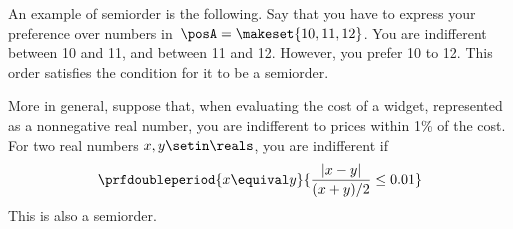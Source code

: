 \begin{example}
    An example of semiorder is the following.
    Say that you have to express your preference over numbers in~$\posA=\makeset{10,11,12}$.
    You are indifferent between 10 and 11, and between 11 and 12.
    However, you prefer 10 to 12.
    This order satisfies the condition for it to be a semiorder.

    More in general, suppose that, when evaluating the cost of a widget, represented as a nonnegative real number, you are indifferent to prices within 1\% of the cost.
    For two real numbers $x,y\setin\reals$, you are indifferent if
    \begin{equation}\label{eq:semiorder-tolerances}
        \prfdoubleperiod{
            x \equival y
        }{
            \frac{| x - y |}{ (x+y)/2} \leq 0.01
        }
    \end{equation}
    This is also a semiorder.
\end{example}

